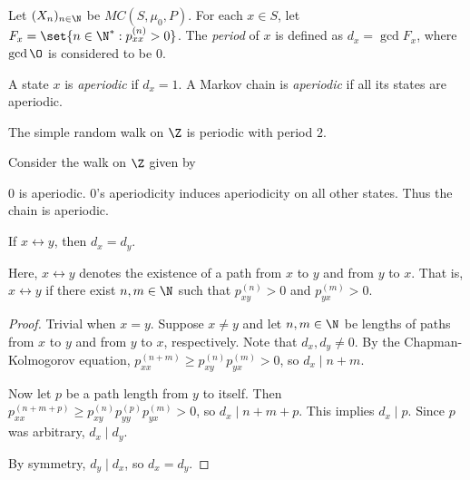 \begin{definition}[Period] \label{def:period}
    Let $(X_n)_{n \in \N}$ be $MC(S, \mu_0, P)$.
    For each $x \in S$, let $F_x = \set{n \in \N^* : p_{xx}^{(n)} > 0}$.
    The \emph{period} of $x$ is defined as $d_x = \gcd F_x$, where
    $\gcd \O$ is considered to be $0$.

    A state $x$ is \emph{aperiodic} if $d_x = 1$.
    A Markov chain is \emph{aperiodic} if all its states are aperiodic.
\end{definition}
\begin{examples}
    \item The simple random walk on $\Z$ is periodic with period $2$.
    \item Consider the walk on $\Z$ given by
    \begin{center}
    \end{center}
    $0$ is aperiodic.
    $0$'s aperiodicity induces aperiodicity on all other states.
    Thus the chain is aperiodic.
\end{examples}
\begin{theorem}
    If $x \leftrightarrow y$, then $d_x = d_y$.
\end{theorem}
Here, $x \leftrightarrow y$ denotes the existence of a path from $x$ to $y$
and from $y$ to $x$.
That is, $x \leftrightarrow y$ if there exist $n, m \in \N$ such that
$p_{xy}^{(n)} > 0$ and $p_{yx}^{(m)} > 0$.
\begin{proof}
    Trivial when $x = y$.
    Suppose $x \ne y$ and let $n, m \in \N$ be lengths of paths from
    $x$ to $y$ and from $y$ to $x$, respectively.
    Note that $d_x, d_y \ne 0$.
    By the Chapman-Kolmogorov equation,
    $p_{xx}^{(n+m)} \ge p_{xy}^{(n)} p_{yx}^{(m)} > 0$, so $d_x \mid n + m$.

    Now let $p$ be a path length from $y$ to itself.
    Then $p_{xx}^{(n + m + p)} \ge p_{xy}^{(n)} p_{yy}^{(p)} p_{yx}^{(m)}
    > 0$, so $d_x \mid n + m + p$.
    This implies $d_x \mid p$.
    Since $p$ was arbitrary, $d_x \mid d_y$.

    By symmetry, $d_y \mid d_x$, so $d_x = d_y$.
\end{proof}


